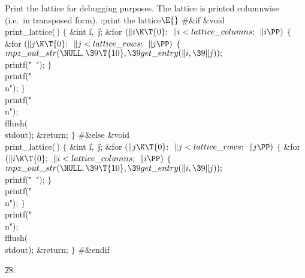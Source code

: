 Print the lattice for debugging purposes.
The lattice is printed columnwise (i.e.~in transposed form).
\Y\B\4:print the lattice\X${}\E{}$\6
\8\#\&{if} \6
\&{void} \\{print\_lattice}(\,)\1\1\2\2\6
${}\{{}$\1\6
\&{int} \|i${},{}$ \|j;\7
\&{for} ${}(\|i\K\T{0};{}$ ${}\|i<\\{lattice\_columns};{}$ ${}\|i\PP){}$\5
${}\{{}$\1\6
\&{for} ${}(\|j\K\T{0};{}$ ${}\|j<\\{lattice\_rows};{}$ ${}\|j\PP){}$\5
${}\{{}$\1\6
${}\\{mpz\_out\_str}(\NULL,\39\T{10},\39\\{get\_entry}(\|i,\39\|j));{}$\6
\\{printf}(\.{"\ "});\6
\4${}\}{}$\2\6
\\{printf}(\.{"\\n"});\6
\4${}\}{}$\2\6
\\{printf}(\.{"\\n"});\5
\\{fflush}(\\{stdout});\6
\&{return};\6
\4${}\}{}$\2\6
\8\#\&{else}\7
\&{void} \\{print\_lattice}(\,)\1\1\2\2\6
${}\{{}$\1\6
\&{int} \|i${},{}$ \|j;\7
\&{for} ${}(\|j\K\T{0};{}$ ${}\|j<\\{lattice\_rows};{}$ ${}\|j\PP){}$\5
${}\{{}$\1\6
\&{for} ${}(\|i\K\T{0};{}$ ${}\|i<\\{lattice\_columns};{}$ ${}\|i\PP){}$\5
${}\{{}$\1\6
${}\\{mpz\_out\_str}(\NULL,\39\T{10},\39\\{get\_entry}(\|i,\39\|j));{}$\6
\\{printf}(\.{"\ "});\6
\4${}\}{}$\2\6
\\{printf}(\.{"\\n"});\6
\4${}\}{}$\2\6
\\{printf}(\.{"\\n"});\5
\\{fflush}(\\{stdout});\6
\&{return};\6
\4${}\}{}$\2\6
\8\#\&{endif}\par
\U28.\fi

